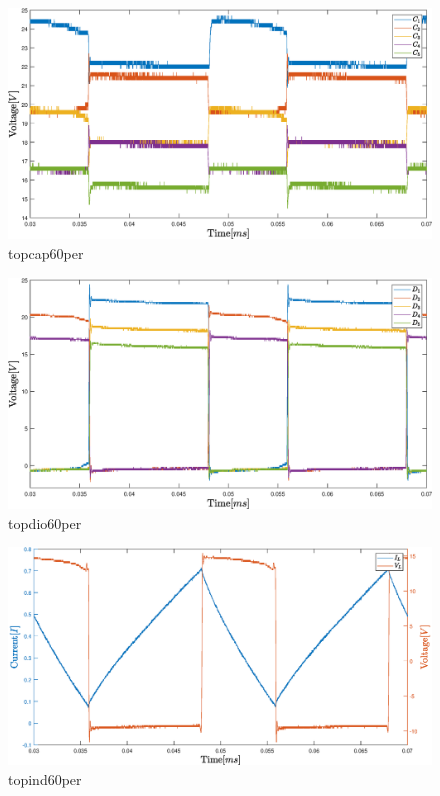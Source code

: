 \begin{figure}[H]
	\begin{center}
   \includegraphics[width=\textwidth]{figures/06Testing/topcap60per.eps}
	\end{center}
	\vspace{-8mm}
	\caption{topcap60per}
	\label{fig:V_OUT_ALL}
\end{figure}
\begin{figure}[H]
	\begin{center}
   \includegraphics[width=\textwidth]{figures/06Testing/topdio60per.eps}
	\end{center}
	\vspace{-8mm}
	\caption{topdio60per}
	\label{fig:V_OUT_ALL}
\end{figure}
\begin{figure}[H]
	\begin{center}
   \includegraphics[width=\textwidth]{figures/06Testing/topind60per.eps}
	\end{center}
	\vspace{-8mm}
	\caption{topind60per}
	\label{fig:V_OUT_ALL}
\end{figure}
